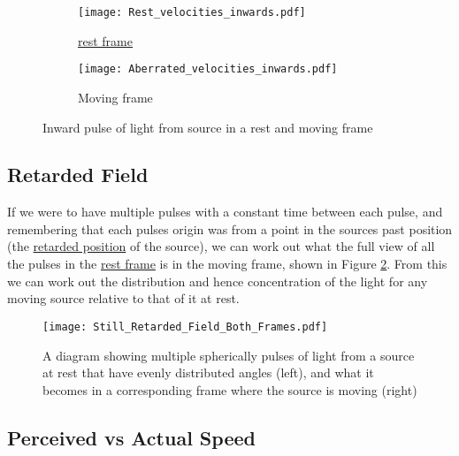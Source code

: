 \begin{figure}[htbp]
\begin{subfigure}{.49\textwidth}
\centering
       \texttt{[image: Rest\_velocities\_inwards.pdf]}
    \caption{\hyperlink{def-proper-frame}{rest frame}}
\end{subfigure}
\begin{subfigure}{.49\textwidth}
\centering
       \texttt{[image: Aberrated\_velocities\_inwards.pdf]}
    \caption{Moving frame}
\end{subfigure}
\caption{Inward pulse of light from source in a rest and moving frame}
\label{fig: Realivistic Beaming}
\end{figure}

\subsection{Retarded Field}

If we were to have multiple pulses with a constant time between each pulse, and remembering that each pulses origin was from a point in the sources past position (the \hyperlink{def-retarded-position}{retarded position}  of the source), we can work out what the full view of all the pulses in the \hyperlink{def-proper-frame}{rest frame} is in the moving frame, shown in Figure \ref{fig: full field transformation 1}. From this we can work out the distribution and hence concentration of the light for any moving source relative to that of it at rest. 

\begin{figure}[ht]
\centering
\texttt{[image: Still\_Retarded\_Field\_Both\_Frames.pdf]}
    \caption{ A diagram showing multiple spherically pulses of light from a source at rest that have evenly distributed angles (left), and what it becomes in a corresponding frame where the source is moving (right)}
    \label{fig: full field transformation 1}
\end{figure}

\subsection{Perceived vs Actual Speed}

